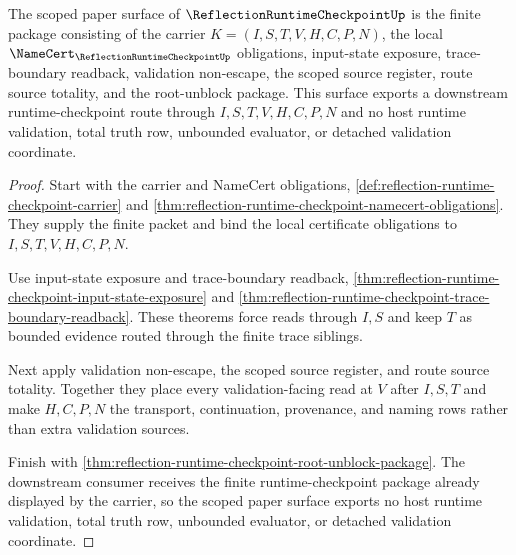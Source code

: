 \begin{theorem}
\label{thm:reflection-runtime-checkpoint-scope-closure-export}
The scoped paper surface of $\ReflectionRuntimeCheckpointUp$ is the finite package consisting of the carrier $K=(I,S,T,V,H,C,P,N)$, the local $\NameCert_{\ReflectionRuntimeCheckpointUp}$ obligations, input-state exposure, trace-boundary readback, validation non-escape, the scoped source register, route source totality, and the root-unblock package. This surface exports a downstream runtime-checkpoint route through $I,S,T,V,H,C,P,N$ and no host runtime validation, total truth row, unbounded evaluator, or detached validation coordinate.
\end{theorem}
\begin{proof}
Start with the carrier and NameCert obligations, \autoref{def:reflection-runtime-checkpoint-carrier} and \autoref{thm:reflection-runtime-checkpoint-namecert-obligations}. They supply the finite packet and bind the local certificate obligations to $I,S,T,V,H,C,P,N$.

Use input-state exposure and trace-boundary readback, \autoref{thm:reflection-runtime-checkpoint-input-state-exposure} and \autoref{thm:reflection-runtime-checkpoint-trace-boundary-readback}. These theorems force reads through $I,S$ and keep $T$ as bounded evidence routed through the finite trace siblings.

Next apply validation non-escape, the scoped source register, and route source totality. Together they place every validation-facing read at $V$ after $I,S,T$ and make $H,C,P,N$ the transport, continuation, provenance, and naming rows rather than extra validation sources.

Finish with \autoref{thm:reflection-runtime-checkpoint-root-unblock-package}. The downstream consumer receives the finite runtime-checkpoint package already displayed by the carrier, so the scoped paper surface exports no host runtime validation, total truth row, unbounded evaluator, or detached validation coordinate.
\end{proof}

